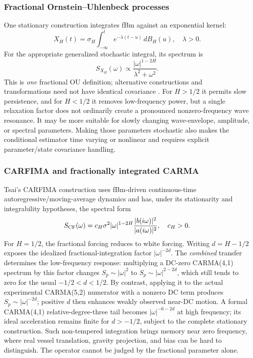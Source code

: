 \subsubsection{Fractional Ornstein--Uhlenbeck processes}
One stationary construction integrates fBm against an exponential kernel:
\begin{equation}
X_H(t)=\sigma_H\int_{-\infty}^{t}
 e^{-\lambda(t-u)}\,dB_H(u),\quad\lambda>0.
\label{eq:frac-fou}
\end{equation}
For the appropriate generalized stochastic integral, its spectrum is
\begin{equation}
S_{X_H}(\omega)\propto
\frac{|\omega|^{1-2H}}{\lambda^2+\omega^2}.
\label{eq:frac-fou-psd}
\end{equation}
This is \emph{one} fractional OU definition; alternative constructions
and transformations need not have identical covariance
\cite{cheridito03}. For \(H>1/2\) it permits slow persistence, and
for \(H<1/2\) it removes low-frequency power, but a single relaxation
factor does not ordinarily create a pronounced nonzero-frequency wave
resonance. It may be more suitable for slowly changing wave-envelope,
amplitude, or spectral parameters. Making those parameters stochastic
also makes the conditional estimator time varying or nonlinear and
requires explicit parameter/state covariance handling.

\subsubsection{CARFIMA and fractionally integrated CARMA}
Tsai's CARFIMA construction uses fBm-driven continuous-time
autoregressive/moving-average dynamics and has, under its stationarity
and integrability hypotheses, the spectral form \cite{tsai09}
\begin{equation}
S_{\rm CF}(\omega)=c_H\sigma^2|\omega|^{1-2H}
 \frac{|b(i\omega)|^2}{|a(i\omega)|^2},\quad c_H>0.
\label{eq:frac-carfima}
\end{equation}
For \(H=1/2\), the fractional forcing reduces to white forcing.
Writing \(d=H-1/2\) exposes the idealized fractional-integration
factor \(|\omega|^{-2d}\). The \emph{combined} transfer determines the
low-frequency response: multiplying a DC-zero CARMA(4,1) spectrum by
this factor changes \(S_p\sim|\omega|^2\) to
\(S_p\sim|\omega|^{2-2d}\), which still tends to zero for the
usual \(-1/2<d<1/2\). By contrast, applying it to the actual
experimental CARMA(5,2) numerator with a nonzero DC term produces
\(S_p\sim|\omega|^{-2d}\); positive \(d\) then enhances weakly
observed near-DC motion. A formal CARMA(4,1) relative-degree-three
tail becomes \(|\omega|^{-6-2d}\) at high frequency; its ideal
acceleration remains finite for \(d>-1/2\), subject to the complete
stationary construction. Such non-tempered integration brings memory
near zero frequency, where real vessel translation, gravity projection,
and bias can be hard to distinguish. The operator cannot be judged by
the fractional parameter alone.

